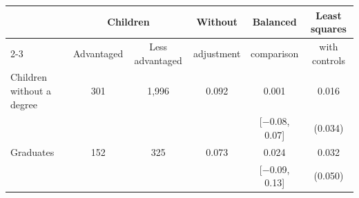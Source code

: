 \begin{tabular}{@{}lccccc@{}}
\toprule
 & \multicolumn{2}{c}{Children} & Without & Balanced & Least squares \\
\cmidrule(lr){2-3}
 & Advantaged & Less advantaged & adjustment & comparison & with controls \\
\midrule
Children without a degree & 301 & 1,996 & 0.092 & 0.001 & 0.016 \\
 & & & & [$-$0.08, 0.07] & (0.034) \\
Graduates & 152 & 325 & 0.073 & 0.024 & 0.032 \\
 & & & & [$-$0.09, 0.13] & (0.050) \\
\bottomrule
\end{tabular}
